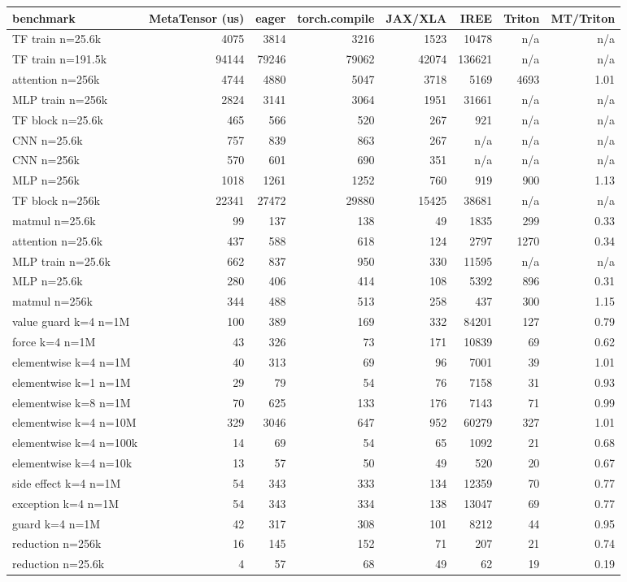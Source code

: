 \begin{tabular}{lrrrrrrr}
\toprule
benchmark & MetaTensor (us) & eager & torch.compile & JAX/XLA & IREE & Triton & MT/Triton \\
\midrule
TF train n=25.6k & 4075 & 3814 & 3216 & 1523 & 10478 & n/a & n/a \\
TF train n=191.5k & 94144 & 79246 & 79062 & 42074 & 136621 & n/a & n/a \\
attention n=256k & 4744 & 4880 & 5047 & 3718 & 5169 & 4693 & 1.01 \\
MLP train n=256k & 2824 & 3141 & 3064 & 1951 & 31661 & n/a & n/a \\
TF block n=25.6k & 465 & 566 & 520 & 267 & 921 & n/a & n/a \\
CNN n=25.6k & 757 & 839 & 863 & 267 & n/a & n/a & n/a \\
CNN n=256k & 570 & 601 & 690 & 351 & n/a & n/a & n/a \\
MLP n=256k & 1018 & 1261 & 1252 & 760 & 919 & 900 & 1.13 \\
TF block n=256k & 22341 & 27472 & 29880 & 15425 & 38681 & n/a & n/a \\
matmul n=25.6k & 99 & 137 & 138 & 49 & 1835 & 299 & 0.33 \\
attention n=25.6k & 437 & 588 & 618 & 124 & 2797 & 1270 & 0.34 \\
MLP train n=25.6k & 662 & 837 & 950 & 330 & 11595 & n/a & n/a \\
MLP n=25.6k & 280 & 406 & 414 & 108 & 5392 & 896 & 0.31 \\
matmul n=256k & 344 & 488 & 513 & 258 & 437 & 300 & 1.15 \\
value guard k=4 n=1M & 100 & 389 & 169 & 332 & 84201 & 127 & 0.79 \\
force k=4 n=1M & 43 & 326 & 73 & 171 & 10839 & 69 & 0.62 \\
elementwise k=4 n=1M & 40 & 313 & 69 & 96 & 7001 & 39 & 1.01 \\
elementwise k=1 n=1M & 29 & 79 & 54 & 76 & 7158 & 31 & 0.93 \\
elementwise k=8 n=1M & 70 & 625 & 133 & 176 & 7143 & 71 & 0.99 \\
elementwise k=4 n=10M & 329 & 3046 & 647 & 952 & 60279 & 327 & 1.01 \\
elementwise k=4 n=100k & 14 & 69 & 54 & 65 & 1092 & 21 & 0.68 \\
elementwise k=4 n=10k & 13 & 57 & 50 & 49 & 520 & 20 & 0.67 \\
side effect k=4 n=1M & 54 & 343 & 333 & 134 & 12359 & 70 & 0.77 \\
exception k=4 n=1M & 54 & 343 & 334 & 138 & 13047 & 69 & 0.77 \\
guard k=4 n=1M & 42 & 317 & 308 & 101 & 8212 & 44 & 0.95 \\
reduction n=256k & 16 & 145 & 152 & 71 & 207 & 21 & 0.74 \\
reduction n=25.6k & 4 & 57 & 68 & 49 & 62 & 19 & 0.19 \\
\bottomrule
\end{tabular}
